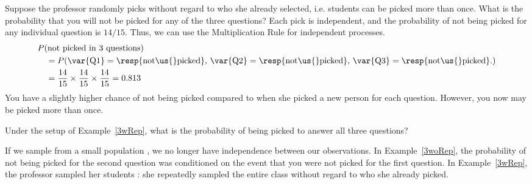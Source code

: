 \begin{examplewrap}
\begin{nexample}{Suppose the professor randomly picks without regard to who she already selected, i.e. students can be picked more than once. What is the probability that you will not be picked for any of the three questions?}\label{3wRep}
Each pick is independent, and the probability of not being picked for any individual question is $14/15$. Thus, we can use the Multiplication Rule for independent processes.
\begin{align*}
&P(\text{not picked in 3 questions}) \\
&\quad = P(\text{\var{Q1}} = \text{\resp{not\us{}picked}, }\text{\var{Q2}} = \text{\resp{not\us{}picked}, }\text{\var{Q3}} = \text{\resp{not\us{}picked}.}) \\
&\quad = \frac{14}{15}\times\frac{14}{15}\times\frac{14}{15} = 0.813
\end{align*}
You have a slightly higher chance of not being picked compared to when she picked a new person for each question. However, you now may be picked more than once.
\end{nexample}
\end{examplewrap}

\begin{exercisewrap}
\begin{nexercise}
Under the setup of Example~\ref{3wRep}, what is the probability of being picked to answer all three questions?\footnotemark
\end{nexercise}
\end{exercisewrap}

If we sample from a small population , we no longer have independence between our observations. In Example~\ref{3woRep}, the probability of not being picked for the second question was conditioned on the event that you were not picked for the first question. In Example~\ref{3wRep}, the professor sampled her students : she repeatedly sampled the entire class without regard to who she already picked. 

